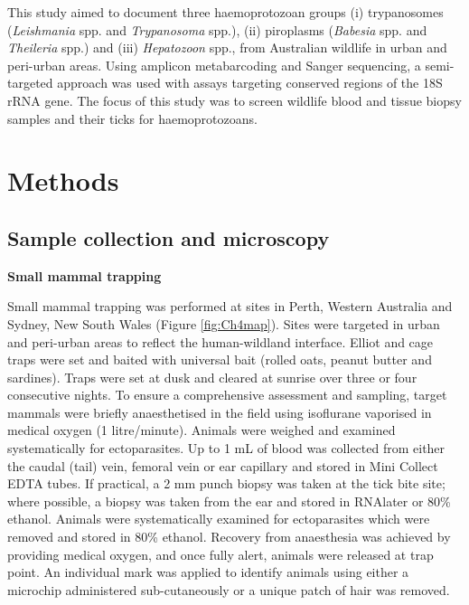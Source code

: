 \documentclass[a4paper, nobind]{templates/ociamthesis}
\begin{document}
This study aimed to document three haemoprotozoan groups (i) trypanosomes (\emph{Leishmania} spp. and \emph{Trypanosoma} spp.), (ii) piroplasms (\emph{Babesia} spp. and \emph{Theileria} spp.) and (iii) \emph{Hepatozoon} spp., from Australian wildlife in urban and peri-urban areas.
Using amplicon metabarcoding and Sanger sequencing, a semi-targeted approach was used with assays targeting conserved regions of the 18S rRNA gene.
The focus of this study was to screen wildlife blood and tissue biopsy samples and their ticks for haemoprotozoans.

\hypertarget{methods-2}{%
\section{Methods}\label{methods-2}}

\hypertarget{sample-collection-and-microscopy}{%
\subsection{Sample collection and microscopy}\label{sample-collection-and-microscopy}}

\textbf{Small mammal trapping}

Small mammal trapping was performed at sites in Perth, Western Australia and Sydney, New South Wales (Figure \ref{fig:Ch4map}).
Sites were targeted in urban and peri-urban areas to reflect the human-wildland interface.
Elliot and cage traps were set and baited with universal bait (rolled oats, peanut butter and sardines).
Traps were set at dusk and cleared at sunrise over three or four consecutive nights.
To ensure a comprehensive assessment and sampling, target mammals were briefly anaesthetised in the field using isoflurane vaporised in medical oxygen (1 litre/minute).
Animals were weighed and examined systematically for ectoparasites.
Up to 1 mL of blood was collected from either the caudal (tail) vein, femoral vein or ear capillary and stored in Mini Collect EDTA tubes.
If practical, a 2 mm punch biopsy was taken at the tick bite site; where possible, a biopsy was taken from the ear and stored in RNAlater or 80\% ethanol.
Animals were systematically examined for ectoparasites which were removed and stored in 80\% ethanol.
Recovery from anaesthesia was achieved by providing medical oxygen, and once fully alert, animals were released at trap point.
An individual mark was applied to identify animals using either a microchip administered sub-cutaneously or a unique patch of hair was removed.
\end{document}
